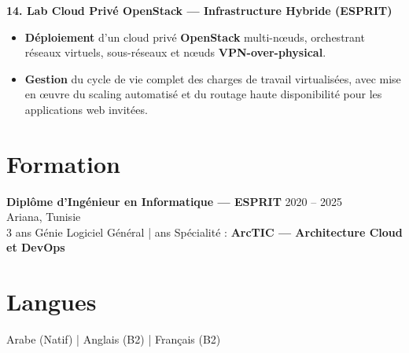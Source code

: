 \documentclass[10pt, letterpaper]{article}
\newenvironment{highlights}{
\begin{itemize}[leftmargin=12pt, itemsep=2pt]
}{
\end{itemize}
}
\begin{document}
\textbf{14. Lab Cloud Privé OpenStack --- Infrastructure Hybride (ESPRIT)}
\begin{highlights}
\item \textbf{Déploiement} d'un cloud privé \textbf{OpenStack} multi-nœuds, orchestrant réseaux virtuels, sous-réseaux et nœuds \textbf{VPN-over-physical}.
\item \textbf{Gestion} du cycle de vie complet des charges de travail virtualisées, avec mise en œuvre du scaling automatisé et du routage haute disponibilité pour les applications web invitées.
\end{highlights}

\section{Formation}
\textbf{Diplôme d'Ingénieur en Informatique --- ESPRIT} \hfill 2020 -- 2025 \\
Ariana, Tunisie \\
3 ans Génie Logiciel Général \;| ans Spécialité : \textbf{ArcTIC --- Architecture Cloud et DevOps}

\section{Langues}
Arabe (Natif) \;|\; Anglais (B2) \;|\; Français (B2)
\end{document}
